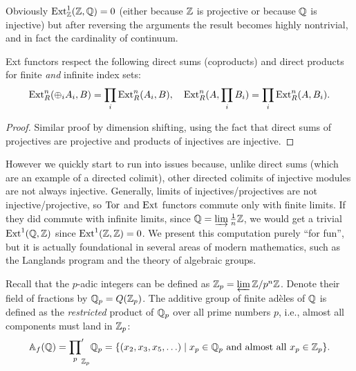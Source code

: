 Obviously $\operatorname{Ext}^1_{\mathbb{Z}}(\mathbb{Z},\mathbb{Q})=0$ (either because $\mathbb{Z}$ is projective or because $\mathbb{Q}$ is injective) but after reversing the arguments the result becomes highly nontrivial, and in fact the cardinality of continuum.

\begin{thm} Ext functors respect the following direct sums (coproducts) and direct products for finite \emph{and} infinite index sets:
    \[\operatorname{Ext}_R^n(\oplus_i A_i,B)=\prod_i\operatorname{Ext}_R^n(A_i,B),\quad \operatorname{Ext}_R^n(A,\prod_i B_i)=\prod_i \operatorname{Ext}_R^n(A,B_i).\]
\end{thm}
\begin{proof}
    Similar proof by dimension shifting, using the fact that direct sums of projectives are projective and products of injectives are injective.
\end{proof}

However we quickly start to run into issues because, unlike direct sums (which are an example of a directed colimit), other directed colimits of injective modules are not always injective. Generally, limits of injectives/projectives are not injective/projective, so $\operatorname{Tor}$ and $\operatorname{Ext}$ functors commute only with finite  limits. If they did commute with infinite limits, since $\mathbb{Q}=\varinjlim \frac{1}{n}\mathbb{Z}$, we would get a trivial $\operatorname{Ext}^1(\mathbb{Q},\mathbb{Z})$ since $\operatorname{Ext}^1(\mathbb{Z},\mathbb{Z})=0$. We present this computation purely ``for fun'', but it is actually foundational in several areas of modern mathematics, such as the Langlands program and the theory of algebraic groups.

\begin{defn}
    Recall that the $p$-adic integers can be defined as $\mathbb{Z}_p=\varprojlim \mathbb{Z}\slash p^n\mathbb{Z}$. Denote their field of fractions by $\mathbb{Q}_p=Q(\mathbb{Z}_p)$. The additive group of finite ad\`eles of $\mathbb{Q}$ is defined as the \emph{restricted} product of $\mathbb{Q}_p$ over all prime numbers $p$, i.e., almost all components must land in $\mathbb{Z}_p$:
    \[\mathbb{A}_f(\mathbb{Q})={\prod_{p}}^\prime_{\mathbb{Z}_p}\mathbb{Q}_p=\{(x_2,x_3,x_5,\ldots)\mid x_p\in\mathbb{Q}_p \text{ and almost all }x_p\in\mathbb{Z}_p \}.\]
\end{defn}

